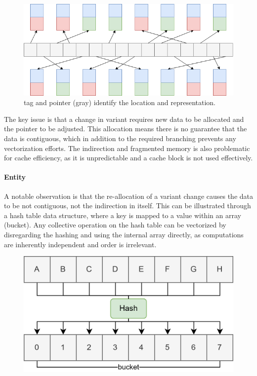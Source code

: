 \documentclass{article}
\begin{document}
\begin{figure}[ht]
    \centering
    \includegraphics[scale=0.4]{taggedpointer}
    \caption{ tag and pointer (gray) identify the location and representation. }
\end{figure}

The key issue is that a change in variant requires new data to be allocated and the pointer to be adjusted.
This allocation means there is no guarantee that the data is contiguous, which in addition to the required branching prevents any vectorization efforts.
The indirection and fragmented memory is also problematic for cache efficiency, as it is unpredictable and a cache block is not used effectively.

\newpage

\paragraph{Entity}

A notable observation is that the re-allocation of a variant change causes the data to be not contiguous, not the indirection in itself.
This can be illustrated through a hash table data structure, where a key is mapped to a value within an array (bucket).
Any collective operation on the hash table can be vectorized by disregarding the hashing and using the internal array directly, as computations are inherently independent and order is irrelevant.   

\begin{figure}[ht]
    \centering
    \includegraphics[scale=0.1]{hashtable}
\end{figure}
\end{document}
